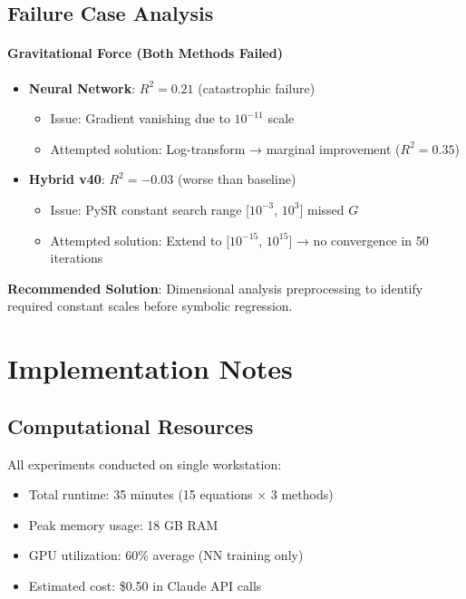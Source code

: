\subsection{Failure Case Analysis}

\paragraph{Gravitational Force (Both Methods Failed)}

\begin{itemize}
    \item \textbf{Neural Network}: $R^2 = 0.21$ (catastrophic failure)
    \begin{itemize}
        \item Issue: Gradient vanishing due to $10^{-11}$ scale
        \item Attempted solution: Log-transform → marginal improvement ($R^2 = 0.35$)
    \end{itemize}
    
    \item \textbf{Hybrid v40}: $R^2 = -0.03$ (worse than baseline)
    \begin{itemize}
        \item Issue: PySR constant search range [$10^{-3}$, $10^3$] missed $G$
        \item Attempted solution: Extend to [$10^{-15}$, $10^{15}$] → no convergence in 50 iterations
    \end{itemize}
\end{itemize}

\textbf{Recommended Solution}: Dimensional analysis preprocessing to identify required constant scales before symbolic regression.

\section{Implementation Notes}
\label{app:implementation}

\subsection{Computational Resources}

All experiments conducted on single workstation:
\begin{itemize}
    \item Total runtime: 35 minutes (15 equations × 3 methods)
    \item Peak memory usage: 18 GB RAM
    \item GPU utilization: 60\% average (NN training only)
    \item Estimated cost: \$0.50 in Claude API calls
\end{itemize}

